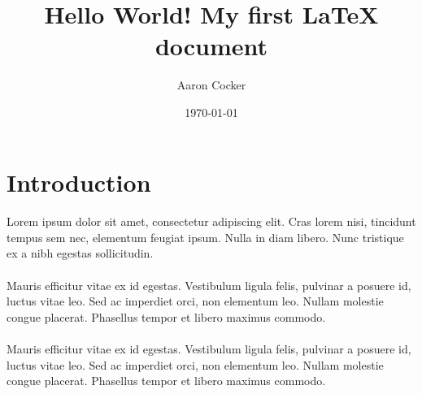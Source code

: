 \documentclass[a4paper,12pt]{article}
\begin{document}
\title{Hello World! My first LaTeX document}
\author{Aaron Cocker}
\date{\today}
\maketitle

\section{Introduction}

\paragraph{}
Lorem ipsum dolor sit amet, consectetur adipiscing elit. Cras lorem nisi, tincidunt tempus sem nec, elementum feugiat ipsum. Nulla in diam libero. Nunc tristique ex a nibh egestas sollicitudin.

\paragraph{}
Mauris efficitur vitae ex id egestas. Vestibulum ligula felis, pulvinar a posuere id, luctus vitae leo. Sed ac imperdiet orci, non elementum leo. Nullam molestie congue placerat. Phasellus tempor et libero maximus commodo.

\paragraph{}
Mauris efficitur vitae ex id egestas. Vestibulum ligula felis, pulvinar a posuere id, luctus vitae leo. Sed ac imperdiet orci, non elementum leo. Nullam molestie congue placerat. Phasellus tempor et libero maximus commodo.
\end{document}
